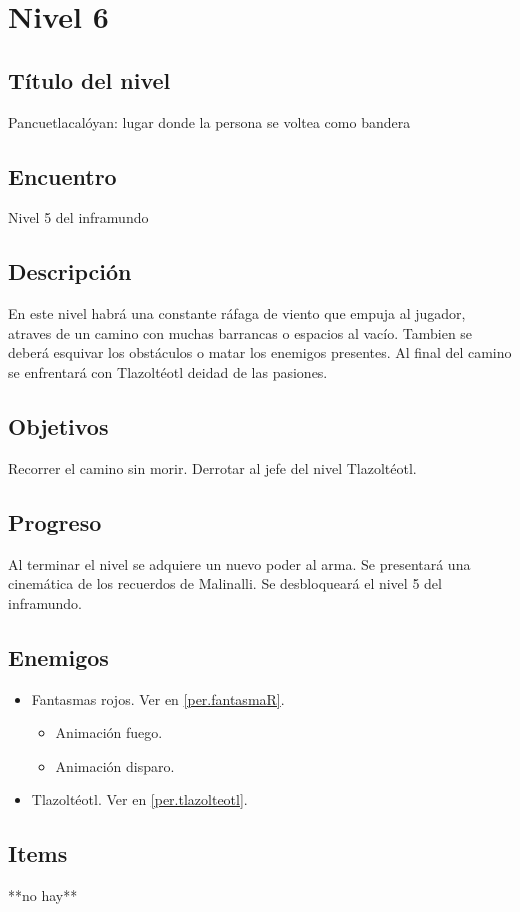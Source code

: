 	\section{Nivel 6}
	\subsection{Título del nivel}
	Pancuetlacalóyan: lugar donde la persona se voltea como bandera
	\subsection{Encuentro}
	Nivel 5 del inframundo
	\subsection{Descripción}
	En este nivel habrá una constante ráfaga de viento que empuja al jugador, atraves de un camino con muchas barrancas o espacios al vacío. Tambien se deberá esquivar los obstáculos o matar los enemigos presentes. Al final del camino se enfrentará con Tlazoltéotl deidad de las pasiones.
	\subsection{Objetivos}
	Recorrer el camino sin morir. Derrotar al jefe del nivel Tlazoltéotl.
	\subsection{Progreso}
	Al terminar el nivel se adquiere un nuevo poder al arma. Se presentará una cinemática de los recuerdos de Malinalli. Se desbloqueará el nivel 5 del inframundo.
	\subsection{Enemigos}
	\begin{itemize}
		\item Fantasmas rojos. Ver en \ref{per.fantasmaR}.
			\begin{itemize}
				\item Animación fuego.
				\item Animación disparo.
			\end{itemize}
		\item Tlazoltéotl. Ver en \ref{per.tlazolteotl}.
	\end{itemize}
	\subsection{Items}
	**no hay**
